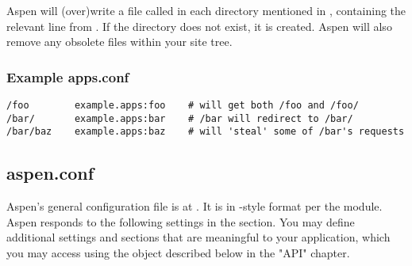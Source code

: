 Aspen will (over)write a file called  in each directory
mentioned in , containing the relevant line from
. If the directory does not exist, it is created. Aspen will
also remove any obsolete  files within your site tree.


\subsubsection{Example apps.conf}

\begin{verbatim}
/foo        example.apps:foo    # will get both /foo and /foo/
/bar/       example.apps:bar    # /bar will redirect to /bar/
/bar/baz    example.apps:baz    # will 'steal' some of /bar's requests
\end{verbatim}


\subsection{aspen.conf}
\label{aspen-conf}

Aspen's general configuration file is at . It is in
-style format per the  module. Aspen responds to
the following settings in the  section. You may define additional
settings and sections that are meaningful to your application, which you may
access using the  object described below in the "API" chapter.


